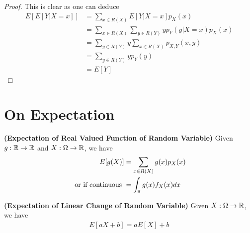 \documentclass{report}
\begin{document}
\begin{proof}
This is clear as one can deduce 
\begin{align*}
E[E[Y|X=x]]&= \sum_{x\in R(X)} E[Y|X=x] p_X(x)\\
&=\sum_{x\in R(X)} \sum_{y \in R(Y)} y p_Y(y |X=x)p_X(x)\\
&=\sum_{y\in R(Y)}y\sum_{x\in R(X)} p_{X,Y}(x,y)\\
&=\sum_{y \in R(Y)} y p_Y(y)\\
&=E[Y]
\end{align*}
\end{proof}
\section{On Expectation}
\begin{theorem}
\label{4.3.1}
\textbf{(Expectation of Real Valued Function of Random Variable)} Given $g:\mathbb{R}\rightarrow \mathbb{R}$ and $X:\Omega\rightarrow \mathbb{R}$, we have 
\begin{align*}
E[g(X)]&=\sum_{x \in R(X)} g(x)p_X(x)\\
\text{ or if continuous }&=\int_{\mathbb{R}} g(x)f_X(x)dx
\end{align*}
\end{theorem}
\begin{corollary}
\label{4.3.2}
\textbf{(Expectation of Linear Change of Random Variable)} Given $X:\Omega\rightarrow \mathbb{R}$, we have 
\begin{align*}
E[aX+b]=aE[X]+b
\end{align*}
\end{corollary}
\end{document}
